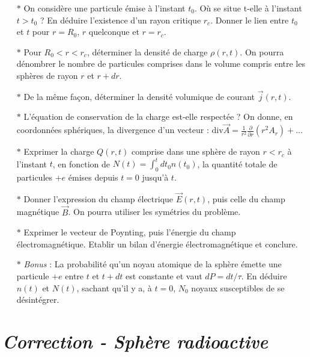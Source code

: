 \documentclass{report}
\begin{document}
\begin{itemize}

	\item[$\ast$] On considère une particule émise à l'instant $t_0$. Où se situe t-elle à l'instant $t>t_0$ ? En déduire l'existence d'un rayon critique $r_c$. Donner le lien entre $t_0$ et $t$ pour $r=R_0$, $r$ quelconque et $r=r_c$.
	
	\item[$\ast$] Pour $R_0<r<r_c$, déterminer la densité de charge $\rho(r,t)$. On pourra dénombrer le nombre de particules comprises dans le volume compris entre les sphères de rayon $r$ et $r+dr$. 
	
	\item[$\ast$] De la même façon, déterminer la densité volumique de courant $\vec{j}(r,t)$. 
	
	\item[$\ast$] L'équation de conservation de la charge est-elle respectée ? On donne, en coordonnées sphériques, la divergence d'un vecteur : $\mathrm{div}\vec{A}=\frac{1}{r^2}\frac{\partial}{\partial r}\left(r^2A_r \right)+\ldots$ 
	
	\item[$\ast$] Exprimer la charge $Q(r,t)$ comprise dans une sphère de rayon $r<r_c$ à l'instant $t$, en fonction de $N(t)=\int_0^t dt_0 n(t_0)$, la quantité totale de particules $+e$ émises depuis $t=0$ jusqu'à $t$.
	
	\item[$\ast$] Donner l'expression du champ électrique $\vec{E}(r,t)$, puis celle du champ magnétique $\vec{B}$. On pourra utiliser les symétries du problème.
	
	\item[$\ast$] Exprimer le vecteur de Poynting, puis l'énergie du champ électromagnétique. Etablir un bilan d'énergie électromagnétique et conclure.
	
		\item[$\ast$] \textit{Bonus} : La probabilité qu'un noyau atomique de la sphère émette une particule $+e$ entre $t$ et $t+dt$ est constante et vaut $dP=dt/\tau$. En déduire $n(t)$ et $N(t)$, sachant qu'il y a, à $t=0$, $N_0$ noyaux susceptibles de se désintégrer.

\end{itemize}

\newpage

\section*{\textit{Correction - Sphère radioactive}}
\end{document}
